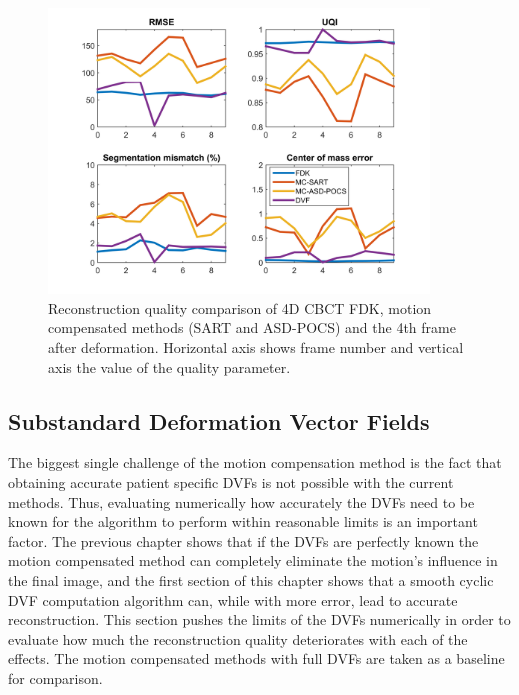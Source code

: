 \begin{figure}
\begin{center}

\includegraphics[width=0.9\textwidth]{accuracyMC/MCCBCTparams.png} 


\end{center}

\caption[Reconstruction quality comparison of motion compensation]{\label{fig:MCCBCTquality} Reconstruction quality comparison of 4D CBCT FDK, motion compensated methods (SART and ASD-POCS) and the 4th frame after deformation. Horizontal axis shows frame number and vertical axis the value of the quality parameter.} 
\end{figure}

\subsection{Substandard Deformation Vector Fields}
The biggest single challenge of the motion compensation method is the fact that obtaining accurate patient specific DVFs is not possible with the current methods. Thus, evaluating numerically how accurately the DVFs need to be known for the algorithm to perform within reasonable limits is an important factor. The previous chapter shows that if the DVFs are perfectly known the motion compensated method can completely eliminate the motion's influence in the final image, and the first section of this chapter shows that a smooth cyclic DVF computation algorithm can, while with more error, lead to accurate reconstruction. This section pushes the limits of the DVFs numerically in order to evaluate how much the reconstruction quality deteriorates with each of the effects. The motion compensated methods with full DVFs are taken as a baseline for comparison.

